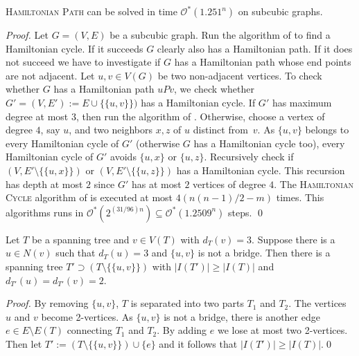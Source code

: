 \documentclass{llncs}
\newcommand{\longversion}[1]{#1}
\newcommand{\mc}{\mathcal}
\newcommand{\Oh}{{\mc{O}}}
\begin{document}
\begin{lemma}
\textsc{Hamiltonian Path} can be solved in time $\Oh^*(1.251^n)$ on subcubic graphs.
\end{lemma}
\longversion{
\begin{proof}
Let $G=(V,E)$ be a subcubic graph. Run the algorithm of \cite{IwaNak07} to find a Hamiltonian cycle. If it succeeds $G$ clearly also has a Hamiltonian
path. If it does 
not succeed we have to investigate if 
$G$ has a Hamiltonian path whose end points are not adjacent. Let $u,v \in V(G)$ be two non-adjacent vertices. To check whether $G$ has a Hamiltonian
path $uPv$, we check
 whether $G'=(V,E'):=E\cup\{\{u,v\}\})$ has a Hamiltonian cycle. If $G'$ has maximum degree at most $3$, then run the algorithm of \cite{IwaNak07}.
Otherwise, choose a vertex of degree $4$, say $u$, and two neighbors $x,z$ of $u$ distinct from~$v$. As $\{u,v\}$ belongs to every Hamiltonian cycle
of $G'$ (otherwise $G$ has a Hamiltonian cycle too), every Hamiltonian cycle of $G'$ avoids $\{u,x\}$ or $\{u,z\}$. Recursively check if
$(V,E'\setminus\{\{u,x\}\})$ or $(V,E'\setminus\{\{u,z\}\})$ has a Hamiltonian cycle. This recursion has depth at most $2$ since $G'$ has at most $2$
vertices of degree $4$.
The \longversion{\textsc{Hamiltonian Cycle }}algorithm of \cite{IwaNak07} is executed at most $4(n(n-1)/2-m)$ times.
 This algorithms runs in  $\longversion{\Oh^*(2^{(31/96)n})\subseteq}\Oh^*(1.2509^n)$ steps.
\qed
\end{proof}
}





\begin{lemma}\label{nodeg3}
Let $T$ be a spanning tree and $v \in V(T)$ with $d_T(v)=3$. Suppose there is a $u \in N(v)$ such that $d_T(u)=3$ and $\{u,v\}$ is not a bridge. Then there is a spanning tree $T'\supset (T\setminus\{\{u,v\}\})$ with $|I(T')|\ge |I(T)|$ and $d_{T'}(u)=d_{T'}(v)=2$.
\end{lemma}
\begin{proof}
By removing $\{u,v\}$, $T$ is separated into two parts $T_1$ and $T_2$. The vertices $u$ and $v$ become 2-vertices.  As $\{u,v\}$ is not a bridge, there is another edge $e \in E \setminus E(T)$ connecting $T_1$ and $T_2$. By adding $e$ we lose at most two 2-vertices. Then let $T':=(T \setminus \{\{u,v\}\}) \cup \{e\}$ and it follows that $|I(T')|\ge |I(T)|$.\qed
\end{proof}
\end{document}
